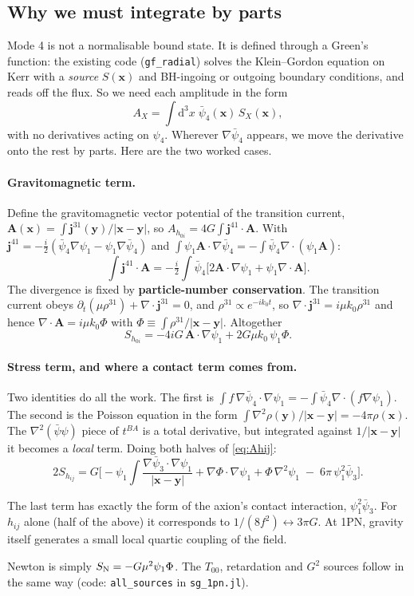 \documentclass[11pt]{article}
\newcommand{\bx}{\mathbf{x}}\newcommand{\by}{\mathbf{y}}\newcommand{\bv}{\mathbf{v}}
\newcommand{\bj}{\mathbf{j}}\newcommand{\bA}{\mathbf{A}}\newcommand{\bn}{\mathbf{n}}
\newcommand{\dd}{\mathrm{d}}
\begin{document}
\subsection{Why we must integrate by parts}
Mode 4 is not a normalisable bound state. It is defined through a Green's function: the existing code (\texttt{gf\_radial}) solves the Klein--Gordon equation on Kerr with a \emph{source} $S(\bx)$ and BH-ingoing or outgoing boundary conditions, and reads off the flux. So we need each amplitude in the form
\[
A_X=\int\dd^3x\;\bar\psi_4(\bx)\,S_X(\bx),
\]
with no derivatives acting on $\psi_4$. Wherever $\nabla\bar\psi_4$ appears, we move the derivative onto the rest by parts. Here are the two worked cases.

\paragraph{Gravitomagnetic term.} Define the gravitomagnetic vector potential of the transition current, $\bA(\bx)=\int\bj^{31}(\by)/|\bx-\by|$, so $A_{h_{0i}}=4G\int\bj^{41}\cdot\bA$. With $\bj^{41}=-\tfrac i2(\bar\psi_4\nabla\psi_1-\psi_1\nabla\bar\psi_4)$ and $\int\psi_1\bA\cdot\nabla\bar\psi_4=-\int\bar\psi_4\nabla\cdot(\psi_1\bA)$:
\[
\int\bj^{41}\cdot\bA=-\tfrac i2\int\bar\psi_4\big[2\bA\cdot\nabla\psi_1+\psi_1\nabla\!\cdot\!\bA\big].
\]
The divergence is fixed by \textbf{particle-number conservation}. The transition current obeys $\partial_t(\mu\rho^{31})+\nabla\cdot\bj^{31}=0$, and $\rho^{31}\propto e^{-ik_0t}$, so $\nabla\cdot\bj^{31}=i\mu k_0\rho^{31}$ and hence $\nabla\cdot\bA=i\mu k_0\Phi$ with $\Phi\equiv\int\rho^{31}/|\bx-\by|$. Altogether
\begin{equation}
S_{h_{0i}}=-4iG\,\bA\cdot\nabla\psi_1+2G\mu k_0\,\psi_1\Phi.
\end{equation}

\paragraph{Stress term, and where a contact term comes from.} Two identities do all the work. The first is $\int f\,\nabla\bar\psi_4\cdot\nabla\psi_1=-\int\bar\psi_4\nabla\cdot(f\nabla\psi_1)$. The second is the Poisson equation in the form $\int\nabla^2\rho(\by)/|\bx-\by|=-4\pi\rho(\bx)$. The $\nabla^2(\bar\psi\psi)$ piece of $t^{BA}$ is a total derivative, but integrated against $1/|\bx-\by|$ it becomes a \emph{local} term. Doing both halves of \eqref{eq:Ahij}:
\begin{equation}
2S_{h_{ij}}=G\Big[-\psi_1\!\int\!\frac{\nabla\bar\psi_3\!\cdot\!\nabla\psi_1}{|\bx-\by|}+\nabla\Phi\cdot\nabla\psi_1+\Phi\,\nabla^2\psi_1\;-\;6\pi\,\psi_1^2\bar\psi_3\Big].
\end{equation}
\begin{idea}[A curiosity]
The last term has exactly the form of the axion's contact interaction, $\psi_1^2\bar\psi_3$. For $h_{ij}$ alone (half of the above) it corresponds to $1/(8f^2)\leftrightarrow3\pi G$. At 1PN, gravity itself generates a small local quartic coupling of the field.
\end{idea}
Newton is simply $S_{\rm N}=-G\mu^2\psi_1\Phi$. The $T_{00}$, retardation and $G^2$ sources follow in the same way (code: \texttt{all\_sources} in \texttt{sg\_1pn.jl}).
\end{document}
